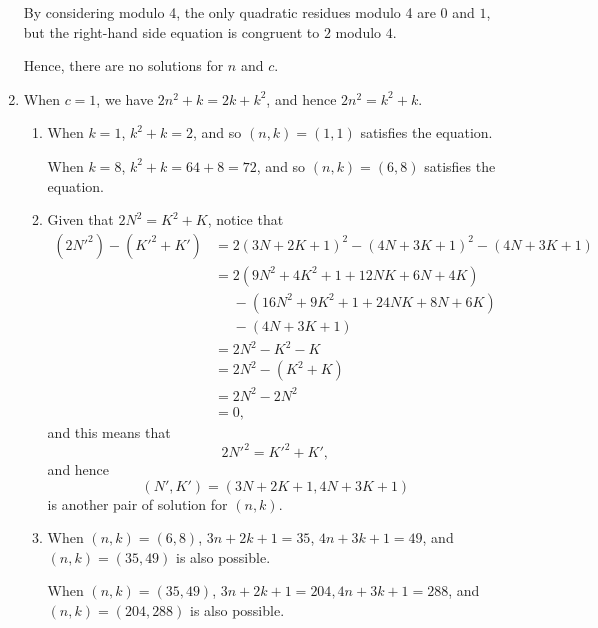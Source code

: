 \begin{enumerate}
          By considering modulo 4, the only quadratic residues modulo 4 are \(0\) and \(1\), but the right-hand side equation is congruent to \(2\) modulo \(4\).

          Hence, there are no solutions for \(n\) and \(c\).

    \item When \(c = 1\), we have \(2n^2 + k = 2k + k^2\), and hence \(2n^2 = k^2 + k\).
          \begin{enumerate}
              \item When \(k = 1\), \(k^2 + k = 2\), and so \((n, k) = (1, 1)\) satisfies the equation.

                    When \(k = 8\), \(k^2 + k = 64 + 8 = 72\), and so \((n, k) = (6, 8)\) satisfies the equation.

              \item Given that \(2N^2 = K^2 + K\), notice that
                    \begin{align*}
                        (2{N'}^2) - ({K'}^2 + K') & = 2 (3N + 2K + 1)^2 - (4N + 3K + 1)^2 - (4N + 3K + 1) \\
                                                  & = 2 (9N^2 + 4K^2 + 1 + 12 NK + 6N + 4K)               \\
                                                  & \phantom{=} - (16N^2 + 9K^2 + 1 + 24NK + 8N + 6K)     \\
                                                  & \phantom{=} - (4N + 3K + 1)                           \\
                                                  & = 2N^2 - K^2 - K                                      \\
                                                  & = 2N^2 - (K^2 + K)                                    \\
                                                  & = 2N^2 - 2N^2                                         \\
                                                  & = 0,
                    \end{align*}
                    and this means that
                    \[
                        2{N'}^2 = {K'}^2 + K',
                    \]
                    and hence
                    \[
                        (N', K') = (3N + 2K + 1, 4N + 3K + 1)
                    \]
                    is another pair of solution for \((n, k)\).

              \item When \((n, k) = (6, 8)\), \(3n + 2k + 1 = 35\), \(4n + 3k + 1 = 49\), and \((n, k) = (35, 49)\) is also possible.

                    When \((n, k) = (35, 49)\), \(3n + 2k + 1 = 204, 4n + 3k + 1 = 288\), and \((n, k) = (204, 288)\) is also possible.
          \end{enumerate}
\end{enumerate}